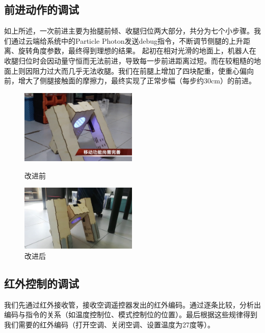     \subsection{前进动作的调试}
    \hspace{1.5em}如上所述，一次前进主要为抬腿前倾、收腿归位两大部分，共分为七个小步骤。我们通过云端给系统中的Particle Photon发送debug指令，不断调节侧腿的上升距离、旋转角度参数，最终得到理想的结果。
    \hspace{1.5em}起初在相对光滑的地面上，机器人在收腿归位时会因动量守恒而无法前进，导致每一步前进距离过短。而在较粗糙的地面上则因阻力过大而几乎无法收腿。我们在前腿上增加了四块配重，使重心偏向前，增大了侧腿接触面的摩擦力，最终实现了正常步幅（每步约30cm）的前进。
    \begin{figure}[H]
        \begin{minipage}[htbp]{0.5\linewidth}
        \centering
        \includegraphics[width=2.2in]{./img/ForwardOld.jpg}
        \caption{改进前}
        \end{minipage}%
        \begin{minipage}[htbp]{0.5\linewidth}
        \centering
        \includegraphics[width=2.2in]{./img/ForwardNew.jpg}
        \caption{改进后}
        \end{minipage}
    \end{figure}

    \subsection{红外控制的调试}
    \hspace{1.5em}我们先通过红外接收管，接收空调遥控器发出的红外编码。通过逐条比较，分析出编码与指令的关系（如温度控制位、模式控制位的位置）。最后根据这些规律得到我们需要的红外编码（打开空调、关闭空调、设置温度为27度等）。

